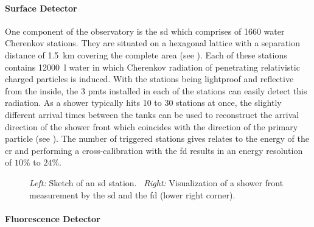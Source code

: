 \paragraph{Surface Detector}

One component of the observatory is the \gls{sd} which comprises of 1660 water Cherenkov stations. They are situated on a hexagonal lattice with a separation distance of \SI{1.5}{\kilo\meter} covering the complete area (see ). Each of these stations contains \SI{12000}{\litre} water in which Cherenkov radiation of penetrating relativistic charged particles is induced. With the stations being lightproof and reflective from the inside, the 3 \glspl{pmt} installed in each of the stations can easily detect this radiation. As a shower typically hits 10 to 30 stations at once, the slightly different arrival times between the tanks can be used to reconstruct the arrival direction of the shower front which coincides with the direction of the primary particle (see ). The number of triggered stations gives relates to the energy of the \gls{cr} and performing a cross-calibration with the \gls{fd} results in an energy resolution of \(10\%{}\) to \(24\%{}\).
\begin{figure}[ht!]
    \centering
    \begin{minipage}{0.4\textwidth}
    \end{minipage}\ind{}
    \begin{minipage}{0.5\textwidth}
    \end{minipage}
    \caption{\emph{Left:} Sketch of an \gls{sd} station.~\cite{Keilhauer2004} \emph{Right:} Visualization of a shower front measurement by the \gls{sd} and the \gls{fd} (lower right corner).~\cite{Collaboration}}\label{fig:sd}
\end{figure}

\paragraph{Fluorescence Detector}

